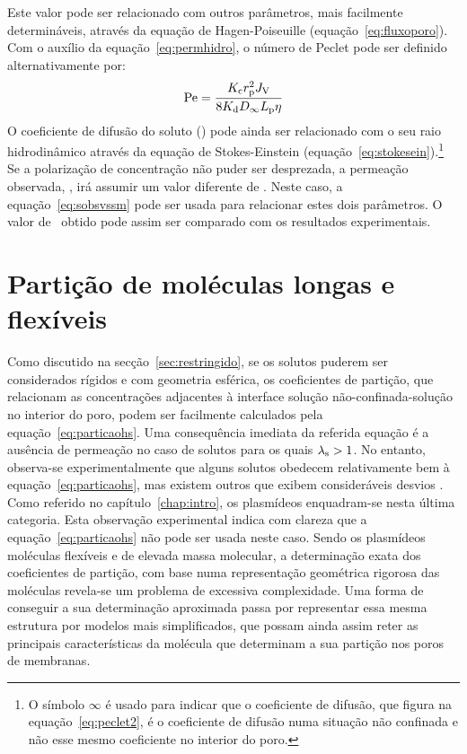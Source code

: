 Este valor pode ser relacionado com outros parâmetros, mais facilmente determináveis, através da equação de Hagen-Poiseuille (equação~\ref{eq:fluxoporo}). Com o auxílio da equação~\ref{eq:permhidro}, o número de Peclet pode ser definido alternativamente por:
\begin{equation}
	\label{eq:peclet2}
	\mathrm{Pe}=\frac{K_{\mathrm{c}}r_{\mathrm{p}}^2J_{\mathrm{V}}}{8K_{\mathrm{d}}D_{\mathit{\infty}}L_{\mathrm{p}}\eta}
\end{equation}%
O coeficiente de difusão do soluto (\dinf) pode ainda ser relacionado com o seu raio hidrodinâmico através da equação de Stokes-Einstein (equação~\ref{eq:stokesein}).\footnote{O símbolo $\infty$ é usado para indicar que o coeficiente de difusão, que figura na equação~\ref{eq:peclet2}, é o coeficiente de difusão numa situação não confinada e não esse mesmo coeficiente no interior do poro.} 
Se a polarização de concentração não puder ser desprezada, a permeação observada, \permobs, irá assumir um valor diferente de \permm. Neste caso, a equação~\ref{eq:sobsvssm} pode ser usada para relacionar estes dois parâmetros. O valor de \permobs\ obtido pode assim ser comparado com os resultados experimentais.

\section{Partição de moléculas longas e flexíveis}
\label{sec:fjcecsc}
Como discutido na secção~\ref{sec:restringido}, se os solutos puderem ser considerados rígidos e com geometria esférica, os coeficientes de partição, que relacionam as concentrações adjacentes à interface solução não-confinada-solução no interior do poro, podem ser facilmente calculados pela equação~\ref{eq:particaohs}. Uma consequência imediata da referida equação é a ausência de permeação no caso de solutos para os quais $\lambda_{\mathrm{s}}> 1$. No entanto, observa-se experimentalmente que alguns solutos obedecem relativamente bem à equação~\ref{eq:particaohs}, mas existem outros que exibem consideráveis desvios \cite{dechadilok}. Como referido no capítulo~\ref{chap:intro}, os plasmídeos enquadram-se nesta última categoria. Esta observação experimental indica com clareza que a equação~\ref{eq:particaohs} não pode ser usada neste caso. Sendo os plasmídeos moléculas flexíveis e de elevada massa molecular, a determinação exata dos coeficientes de partição, com base numa representação geométrica rigorosa das moléculas revela-se um problema de excessiva complexidade. Uma forma de conseguir a sua determinação aproximada passa por representar essa mesma estrutura por modelos mais simplificados, que possam ainda assim reter as principais características da molécula que determinam a sua partição nos poros de membranas.   

